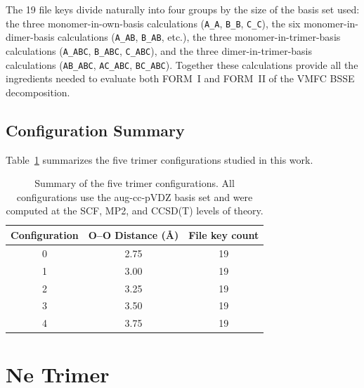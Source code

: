 The 19 file keys divide naturally into four groups by the size of the
basis set used: the three monomer-in-own-basis calculations
(\texttt{A\_A}, \texttt{B\_B}, \texttt{C\_C}), the six
monomer-in-dimer-basis calculations (\texttt{A\_AB}, \texttt{B\_AB},
etc.), the three monomer-in-trimer-basis calculations
(\texttt{A\_ABC}, \texttt{B\_ABC}, \texttt{C\_ABC}), and the three
dimer-in-trimer-basis calculations (\texttt{AB\_ABC}, \texttt{AC\_ABC},
\texttt{BC\_ABC}). Together these calculations provide all the
ingredients needed to evaluate both FORM~I and FORM~II of the VMFC
BSSE decomposition.

\subsection{Configuration Summary}

Table~\ref{tab:h2o_trimer_configs} summarizes the five  trimer
configurations studied in this work.

\begin{table}[!ht]
    \centering
    \caption{Summary of the five  trimer configurations.
    All configurations use the aug-cc-pVDZ basis set and were computed
    at the SCF, MP2, and CCSD(T) levels of theory.}
    \label{tab:h2o_trimer_configs}
    \begin{tabular}{ccc}
        \toprule
        Configuration & O--O Distance (\AA) & File key count \\
        \midrule
        0 & 2.75 & 19 \\
        1 & 3.00 & 19 \\
        2 & 3.25 & 19 \\
        3 & 3.50 & 19 \\
        4 & 3.75 & 19 \\
        \bottomrule
    \end{tabular}
\end{table}

\section{Ne Trimer}


